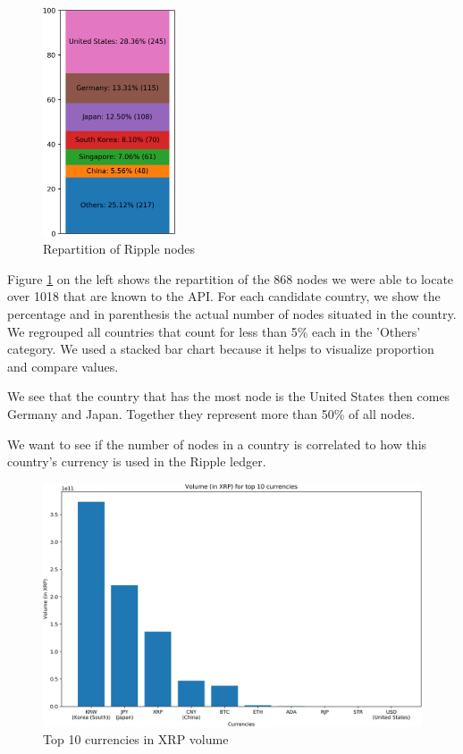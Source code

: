 \begin{figure}
    \includegraphics[width = 0.35\textwidth,keepaspectratio]{repartiton_of_nodes.png}
    \caption{Repartition of Ripple nodes}
    \label{fig:repartition}
\end{figure}

Figure \ref{fig:repartition} on the left shows the repartition of the 868 nodes we were able to locate over 1018 that are known to the API. For each candidate country, we show the percentage and in parenthesis the actual number of nodes situated in the country. We regrouped all countries that count for less than 5\% each in the 'Others' category. We used a stacked bar chart because it helps to visualize proportion and compare values.

We see that the country that has the most node is the United States then comes Germany and Japan. Together they represent more than 50\% of all nodes. 
\vspace{\baselineskip}

We want to see if the number of nodes in a country is correlated to how this country's currency is used in the Ripple ledger.

\begin{figure}[b!]
    \centering
    \includegraphics[width = 0.95\linewidth]{top_10_currencies_in_volume_in_XRP.png}
    \caption{Top 10 currencies in XRP volume}
    \label{fig:volume}
\end{figure}

